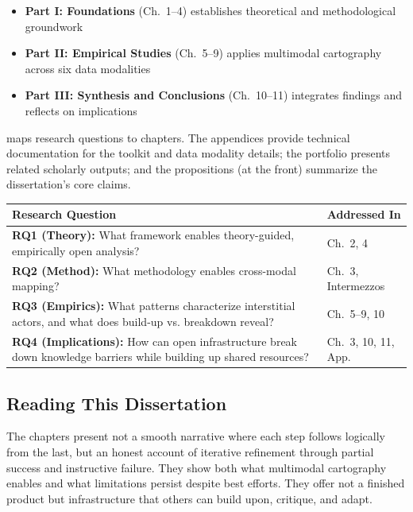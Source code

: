 \documentclass[../main.tex]{subfiles}
\begin{document}
\begin{itemize}[leftmargin=*]
\item \textbf{Part I: Foundations} (Ch.\ 1--4) establishes theoretical and methodological groundwork
\item \textbf{Part II: Empirical Studies} (Ch.\ 5--9) applies multimodal cartography across six data modalities
\item \textbf{Part III: Synthesis and Conclusions} (Ch.\ 10--11) integrates findings and reflects on implications
\end{itemize}

 maps research questions to chapters. The appendices provide technical documentation for the \RoleBox{} toolkit and data modality details; the portfolio presents related scholarly outputs; and the propositions (at the front) summarize the dissertation's core claims.

\begin{center}
\small
\begin{tabular}{@{}p{5.5cm}p{4.5cm}@{}}
\toprule
\textbf{Research Question} & \textbf{Addressed In} \\
\midrule
\textbf{RQ1 (Theory):} What framework enables theory-guided, empirically open analysis? & Ch.~2, 4 \\[0.6em]
\textbf{RQ2 (Method):} What methodology enables cross-modal mapping? & Ch.~3, Intermezzos \\[0.6em]
\textbf{RQ3 (Empirics):} What patterns characterize interstitial actors, and what does build-up vs. breakdown reveal? & Ch.~5--9, 10 \\[0.6em]
\textbf{RQ4 (Implications):} How can open infrastructure break down knowledge barriers while building up shared resources? & Ch.~3, 10, 11, App. \\
\bottomrule
\end{tabular}
\label{tab:intro:rq-mapping}
\end{center}

\subsection{Reading This Dissertation}

The chapters present not a smooth narrative where each step follows logically from the last, but an honest account of iterative refinement through partial success and instructive failure. They show both what multimodal cartography enables and what limitations persist despite best efforts. They offer not a finished product but infrastructure that others can build upon, critique, and adapt.
\end{document}

